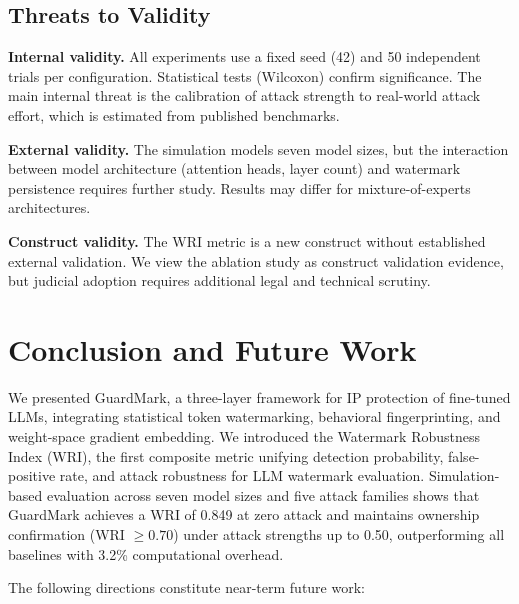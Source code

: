 \documentclass[journal,compsoc]{IEEEtran}
\begin{document}
\subsection{Threats to Validity}

\textbf{Internal validity.} All experiments use a fixed seed (42) and 50
independent trials per configuration. Statistical tests (Wilcoxon) confirm
significance. The main internal threat is the calibration of attack strength
to real-world attack effort, which is estimated from published benchmarks.

\textbf{External validity.} The simulation models seven model sizes, but the
interaction between model architecture (attention heads, layer count) and
watermark persistence requires further study. Results may differ for
mixture-of-experts architectures.

\textbf{Construct validity.} The WRI metric is a new construct without
established external validation. We view the ablation study as construct
validation evidence, but judicial adoption requires additional legal and
technical scrutiny.

\section{Conclusion and Future Work}
\label{sec:conclusion}

We presented GuardMark, a three-layer framework for IP protection of fine-tuned
LLMs, integrating statistical token watermarking, behavioral fingerprinting, and
weight-space gradient embedding. We introduced the Watermark Robustness Index
(WRI), the first composite metric unifying detection probability, false-positive
rate, and attack robustness for LLM watermark evaluation. Simulation-based
evaluation across seven model sizes and five attack families shows that
GuardMark achieves a WRI of 0.849 at zero attack and maintains ownership
confirmation (WRI $\geq 0.70$) under attack strengths up to 0.50, outperforming
all baselines with 3.2\% computational overhead.

The following directions constitute near-term future work:
\end{document}
